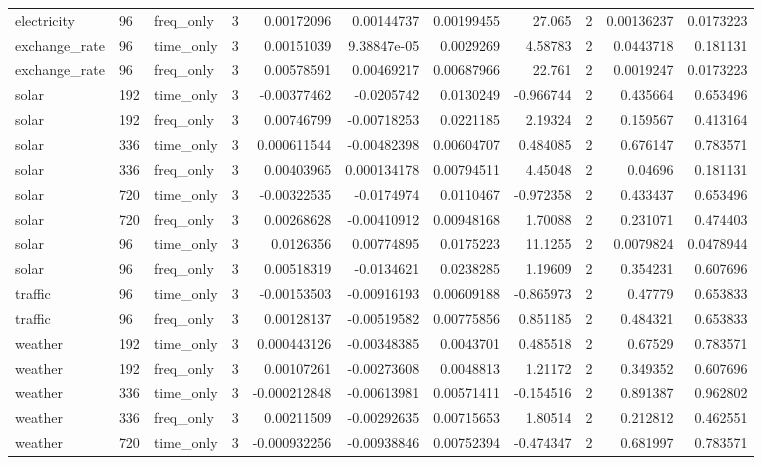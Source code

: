 \begin{longtable}{lllrrrrrrrr}
electricity & 96 & freq\_only & 3 & 0.00172096 & 0.00144737 & 0.00199455 & 27.065 & 2 & 0.00136237 & 0.0173223 \\
exchange\_rate & 96 & time\_only & 3 & 0.00151039 & 9.38847e-05 & 0.0029269 & 4.58783 & 2 & 0.0443718 & 0.181131 \\
exchange\_rate & 96 & freq\_only & 3 & 0.00578591 & 0.00469217 & 0.00687966 & 22.761 & 2 & 0.0019247 & 0.0173223 \\
solar & 192 & time\_only & 3 & -0.00377462 & -0.0205742 & 0.0130249 & -0.966744 & 2 & 0.435664 & 0.653496 \\
solar & 192 & freq\_only & 3 & 0.00746799 & -0.00718253 & 0.0221185 & 2.19324 & 2 & 0.159567 & 0.413164 \\
solar & 336 & time\_only & 3 & 0.000611544 & -0.00482398 & 0.00604707 & 0.484085 & 2 & 0.676147 & 0.783571 \\
solar & 336 & freq\_only & 3 & 0.00403965 & 0.000134178 & 0.00794511 & 4.45048 & 2 & 0.04696 & 0.181131 \\
solar & 720 & time\_only & 3 & -0.00322535 & -0.0174974 & 0.0110467 & -0.972358 & 2 & 0.433437 & 0.653496 \\
solar & 720 & freq\_only & 3 & 0.00268628 & -0.00410912 & 0.00948168 & 1.70088 & 2 & 0.231071 & 0.474403 \\
solar & 96 & time\_only & 3 & 0.0126356 & 0.00774895 & 0.0175223 & 11.1255 & 2 & 0.0079824 & 0.0478944 \\
solar & 96 & freq\_only & 3 & 0.00518319 & -0.0134621 & 0.0238285 & 1.19609 & 2 & 0.354231 & 0.607696 \\
traffic & 96 & time\_only & 3 & -0.00153503 & -0.00916193 & 0.00609188 & -0.865973 & 2 & 0.47779 & 0.653833 \\
traffic & 96 & freq\_only & 3 & 0.00128137 & -0.00519582 & 0.00775856 & 0.851185 & 2 & 0.484321 & 0.653833 \\
weather & 192 & time\_only & 3 & 0.000443126 & -0.00348385 & 0.0043701 & 0.485518 & 2 & 0.67529 & 0.783571 \\
weather & 192 & freq\_only & 3 & 0.00107261 & -0.00273608 & 0.0048813 & 1.21172 & 2 & 0.349352 & 0.607696 \\
weather & 336 & time\_only & 3 & -0.000212848 & -0.00613981 & 0.00571411 & -0.154516 & 2 & 0.891387 & 0.962802 \\
weather & 336 & freq\_only & 3 & 0.00211509 & -0.00292635 & 0.00715653 & 1.80514 & 2 & 0.212812 & 0.462551 \\
weather & 720 & time\_only & 3 & -0.000932256 & -0.00938846 & 0.00752394 & -0.474347 & 2 & 0.681997 & 0.783571 \\

\end{longtable}
